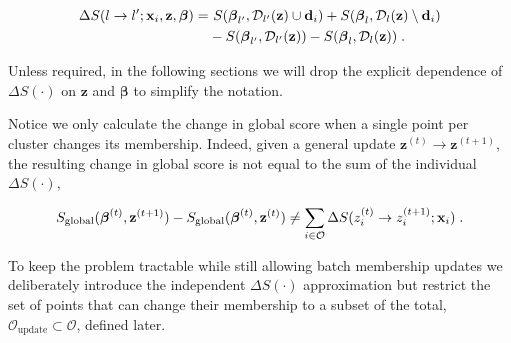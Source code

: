 \begin{equation}
  \left.
  \begin{aligned}
    \Delta S (l \rightarrow l^\prime; \mathbf{x}_i, \mathbf{z}, \boldsymbol{\beta}) =&\ S(\boldsymbol{\beta}_{l^\prime}, \mathcal{D}_{l^\prime}(\mathbf{z}) \cup \mathbf{d}_i) + S(\boldsymbol{\beta}_{l}, \mathcal{D}_{l}(\mathbf{z}) \setminus \mathbf{d}_i)
    \\ &- S(\boldsymbol{\beta}_{l^\prime}, \mathcal{D}_{l^\prime}(\mathbf{z})) - S(\boldsymbol{\beta}_{l}, \mathcal{D}_{l}(\mathbf{z})) \;.
  \end{aligned}
  \right.
  \label{eq:clustering:change_score}
\end{equation}

Unless required, in the following sections we will drop the explicit dependence of $\Delta S (\cdot)$ on $\mathbf{z}$ and $\boldsymbol{\beta}$ to simplify the notation.

\smallskip
Notice we only calculate the change in global score when a single point per cluster changes its membership. Indeed, given a general update $\mathbf{z}^{(t)} \rightarrow \mathbf{z}^{(t+1)}$, the resulting change in global score is not equal to the sum of the individual $\Delta S (\cdot)$,

\begin{equation}
  S_{\mathrm{global}}(\boldsymbol{\beta}^{(t)}, \mathbf{z}^{(t+1)}) - S_{\mathrm{global}}(\boldsymbol{\beta}^{(t)}, \mathbf{z}^{(t)}) \neq \displaystyle\sum_{i \in \mathcal{O}} \Delta S (z_i^{(t)} \rightarrow z_i^{(t+1)}; \mathbf{x}_i) \;.
\end{equation}

To keep the problem tractable while still allowing batch membership updates we deliberately introduce the independent $\Delta S (\cdot)$ approximation but restrict the set of points that can change their membership to a subset of the total, $\mathcal{O}_{\mathrm{update}} \subset \mathcal{O}$, defined later.

